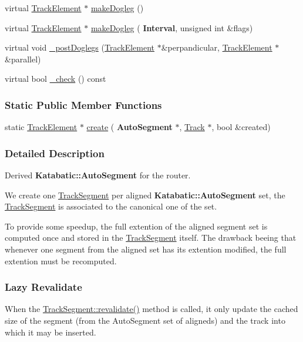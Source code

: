 \begin{DoxyCompactItemize}
\item 
virtual \mbox{\hyperlink{classKite_1_1TrackElement}{Track\+Element}} $\ast$ \mbox{\hyperlink{classKite_1_1TrackSegment_a7a9637875364e84e6862de0102341715}{make\+Dogleg}} ()
\item 
virtual \mbox{\hyperlink{classKite_1_1TrackElement}{Track\+Element}} $\ast$ \mbox{\hyperlink{classKite_1_1TrackSegment_a524f1569b2f2c1a84df2fe47e84e28ed}{make\+Dogleg}} (\textbf{ Interval}, unsigned int \&flags)
\item 
virtual void \mbox{\hyperlink{classKite_1_1TrackSegment_a10a45c049d0bd7d01c7eff1c5441c7a2}{\+\_\+post\+Doglegs}} (\mbox{\hyperlink{classKite_1_1TrackElement}{Track\+Element}} $\ast$\&perpandicular, \mbox{\hyperlink{classKite_1_1TrackElement}{Track\+Element}} $\ast$\&parallel)
\item 
virtual bool \mbox{\hyperlink{classKite_1_1TrackSegment_ad79f4c6ea0fe1135b8264a29af085909}{\+\_\+check}} () const
\end{DoxyCompactItemize}
\subsubsection*{Static Public Member Functions}
\begin{DoxyCompactItemize}
\item 
static \mbox{\hyperlink{classKite_1_1TrackElement}{Track\+Element}} $\ast$ \mbox{\hyperlink{classKite_1_1TrackSegment_a536f91d468e6c2097f85169e6d790f64}{create}} (\textbf{ Auto\+Segment} $\ast$, \mbox{\hyperlink{classKite_1_1Track}{Track}} $\ast$, bool \&created)
\end{DoxyCompactItemize}


\subsubsection{Detailed Description}
Derived \textbf{ Katabatic\+::\+Auto\+Segment} for the router. 

 We create one \mbox{\hyperlink{classKite_1_1TrackSegment}{Track\+Segment}} per aligned \textbf{ Katabatic\+::\+Auto\+Segment} set, the \mbox{\hyperlink{classKite_1_1TrackSegment}{Track\+Segment}} is associated to the canonical one of the set.

To provide some speedup, the full extention of the aligned segment set is computed once and stored in the \mbox{\hyperlink{classKite_1_1TrackSegment}{Track\+Segment}} itself. The drawback beeing that whenever one segment from the aligned set has it\textquotesingle{}s extention modified, the full extention must be recomputed.\hypertarget{classKite_1_1TrackSegment_secTSLazyRevalidate}{}\subsubsection{Lazy Revalidate}\label{classKite_1_1TrackSegment_secTSLazyRevalidate}
When the \mbox{\hyperlink{classKite_1_1TrackSegment_a5bd93abe1416952ace15a98dbeeed124}{Track\+Segment\+::revalidate()}} method is called, it only update the cached size of the segment (from the Auto\+Segment set of aligneds) and the track into which it may be inserted.

